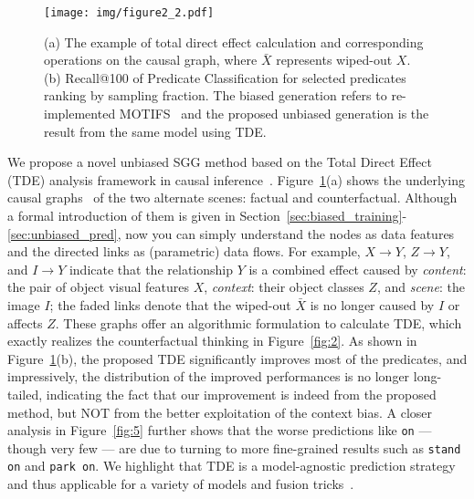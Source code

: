\documentclass[10pt,twocolumn,letterpaper]{article}
\begin{document}
\begin{figure}[t!]
   \begin{minipage}[b]{1.0\linewidth}
   \centerline{\texttt{[image: img/figure2\_2.pdf]}}
   \end{minipage}
   \caption{(a) The example of total direct effect calculation and corresponding operations on the causal graph, where $\bar{X}$ represents wiped-out $X$. (b) Recall@100 of Predicate Classification for selected predicates ranking by sampling fraction. The biased generation refers to re-implemented MOTIFS~\cite{zellers2018neural} and the proposed unbiased generation is the result from the same model using TDE.}
   \label{fig:3} \vspace{-0.2in}
\end{figure}

We propose a novel unbiased SGG method based on the Total Direct Effect (TDE) analysis framework in causal inference~\cite{vanderweele2015explanation, pearl2001direct, vanderweele2013three}. Figure~\ref{fig:3}(a) shows the underlying causal graphs~\cite{pearl2016causal, Judea2018thebookofwhy} of the two alternate scenes: factual and counterfactual. Although a formal introduction of them is given in Section~\ref{sec:biased_training}-\ref{sec:unbiased_pred}, now you can simply understand the nodes as data features and the directed links as (parametric) data flows. For example, $X\rightarrow Y$, $Z\rightarrow Y$, and $I\rightarrow Y$ indicate that the relationship $Y$ is a combined effect caused by \emph{content}: the pair of object visual features $X$, \emph{context}: their object classes $Z$, and \emph{scene}: the image $I$; the faded links denote that the wiped-out $\bar{X}$ is no longer caused by $I$ or affects $Z$. These graphs offer an algorithmic formulation to calculate TDE, which exactly realizes the counterfactual thinking in Figure~\ref{fig:2}. As shown in Figure~\ref{fig:3}(b), the proposed TDE significantly improves most of the predicates, and impressively, the distribution of the improved performances is no longer long-tailed, indicating the fact that our improvement is indeed from the proposed method, but NOT from the better exploitation of the context bias. A closer analysis in Figure~\ref{fig:5} further shows that the worse predictions like \texttt{on} --- though very few --- are due to turning to more fine-grained results such as \texttt{stand on} and \texttt{park on}. We highlight that TDE is a model-agnostic prediction strategy and thus applicable for a variety of models and fusion tricks~\cite{zhang2017visual, zellers2018neural, tang2019learning}.
\end{document}
